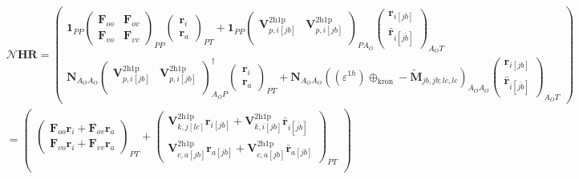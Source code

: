 \begin{align}
&    \bm{\mathcal{N}} \bm{H} \bm{R}
= 
\begin{pmatrix}
\bm{1}_{PP}
 \begin{pmatrix}
\bm{F}_{oo} & \bm{F}_{ov} \\ \bm{F}_{vo} & \bm{F}_{vv}
\end{pmatrix}_{PP} \begin{pmatrix}
\bm{r}_i \\ \bm{r}_a
\end{pmatrix}_{PT} + \bm{1}_{PP}\begin{pmatrix}
    \bm{V}^{2 \mathrm{h1p}}_{p,i[jb]} & \bm{V}^{2 \mathrm{h1p}}_{p,i[{jb}]} \\
\end{pmatrix}_{PA_O} \begin{pmatrix}
    \bm{r}_{i[jb]} \\
\bm{\bar{r}}_{i[\bar{jb}]}
\end{pmatrix}_{A_OT} \\[6pt]
 \bm{N}_{A_OA_O}\begin{pmatrix}
    \bm{V}^{2 \mathrm{h1p}}_{p,i[jb]} & \bm{V}^{2 \mathrm{h1p}}_{p,i[{jb}]} \\
\end{pmatrix}^\dag_{A_OP} \begin{pmatrix}
\bm{r}_i \\ \bm{r}_a
\end{pmatrix}_{PT} +
\bm{N}_{A_OA_O}\left(\left(\varepsilon^{1h}\right) \oplus_{\text{kron}} -\bm{\tilde{M}}_{jb,jb;lc,lc}\right)_{A_OA_O} \begin{pmatrix}
    \bm{r}_{i[jb]} \\
\bm{\bar{r}}_{i[\bar{jb}]}
\end{pmatrix}_{A_OT}
\end{pmatrix} \\
&= \begin{pmatrix}
 \begin{pmatrix}
\bm{F}_{oo}\bm{r}_i + \bm{F}_{ov}\bm{r}_a \\ \bm{F}_{vo}\bm{r}_i + \bm{F}_{vv}\bm{r}_a
\end{pmatrix}_{PT} + \begin{pmatrix}
    \bm{V}^{2 \mathrm{h1p}}_{k,j[lc]}\bm{r}_{i[jb]} + \bm{V}^{2 \mathrm{h1p}}_{k,i[{jb}]}\bm{\bar{r}}_{i[\bar{jb}]}\\ \bm{V}^{2 \mathrm{h1p}}_{c,a[jb]}\bm{r}_{a[jb]} + \bm{V}^{2 \mathrm{h1p}}_{c,a[{jb}]}\bm{\bar{r}}_{a[{jb}]}
\end{pmatrix}_{PT} \\[6pt]

\end{pmatrix}
\end{align}
